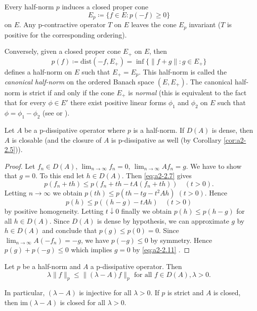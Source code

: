 \begin{remark}\label{rem:a2-2.8}
Every half-norm $p$ induces a closed proper cone 
\[
E_{p} \coloneqq \{f \in E \colon p(-f) \geq 0\}
\] 
on $E$.
Any p-contractive operator $T$ on $E$ leaves the cone $E_{p}$ invariant (\ie  $T$ is positive for the corresponding ordering).

Conversely, given a closed proper cone $E_{+}$ on $E$, then 
\[
p(f) \coloneqq \text{dist}(-f,E_{+}) = \inf\{\|f + g\| \colon g \in E_{+}\}
\]
defines a half-norm on $E$ such that $E_{+} = E_{p}$.
This half-norm is called the \emph{canonical half-norm} on the ordered Banach space $(E,E_{+})$.
The canonical half-norm is strict if and only if the cone $E_{+}$ is \emph{normal} (this is equivalent to the fact that for every $\phi \in E'$ there exist positive linear forms $\phi_{1}$ and $\phi_{2}$ on $E$ such that $\phi = \phi_{1} - \phi_{2}$ (see \citet{battyrobinson:1984} or \citet[Chapter V]{schaefer:1966}).
\end{remark}
\begin{proposition}\label{prop:a2-2.9}
Let $A$ be a p-dissipative operator where $p$ is a half-norm.
If $D(A)$ is dense, then $A$ is closable (and the closure of $A$ is p-dissipative as well (by Corollary \ref{cor:a2-2.5})). 
\end{proposition}

\begin{proof}
Let $f_n \in D(A)$, $\lim_{n \to \infty} f_{n} = 0$, $\lim_{n \to \infty} Af_{n} = g$.
We have to show that $g = 0$.
To this end let $h \in D(A)$.
Then \eqref{eq:a2-2.7}   
gives 
%	
\[
p(f_{n} + th) \leq p(f_{n} + th - tA(f_{n} + th)) \quad (t > 0) .
\]
%
Letting $n \to \infty$ we obtain 
$p(th) \leq p(th - tg - t^{2}Ah)$ \quad $(t > 0)$.
Hence 
\[
p(h) \leq p((h-g) - tAh) \quad (t > 0)
\] 
by positive homogeneity.
Letting $t \downarrow 0$ finally we obtain $p(h) \leq p(h - g)$ for all $h \in D(A)$.
Since $D(A)$ is dense by hypothesis, we can approximate $g$ by $h \in D(A)$ and conclude that $p(g) \leq p(0) = 0$.
Since $\lim_{n\to\infty} A(-f_{n}) = -g$, we have $p(-g) \leq 0$ by symmetry.
Hence $p(g) + p(-g) \leq 0$ which implies $g = 0$ by \eqref{eq:a2-2.11} . 
\end{proof}

\begin{lemma}\label{lem:a2-2.10}
Let $p$ be a half-norm and $A$ a p-dissipative operator.
Then
\begin{equation}\label{eq:a2-2.14}
\lambda\|f\|_{p} \leq \|(\lambda - A)f\|_{p} \text{ for all } f \in D(A), \lambda > 0.
\end{equation}

In particular, $(\lambda-A)$ is injective for all $\lambda > 0$.
If $p$ is strict and $A$ is closed, then $\text{im}(\lambda - A)$ is closed for all $\lambda > 0$.
\end{lemma}

